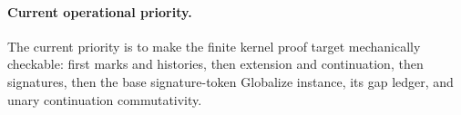 \paragraph{Current operational priority.}
The current priority is to make the finite kernel proof target mechanically checkable: first marks and histories, then extension and continuation, then signatures, then the base signature-token Globalize instance, its gap ledger, and unary continuation commutativity.
